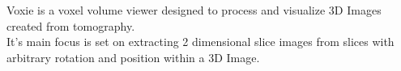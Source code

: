 Voxie is a voxel volume viewer designed to process and visualize 3D Images created from tomography.
\\
It's main focus is set on extracting 2 dimensional slice images from slices with arbitrary rotation and position within a 3D Image.
